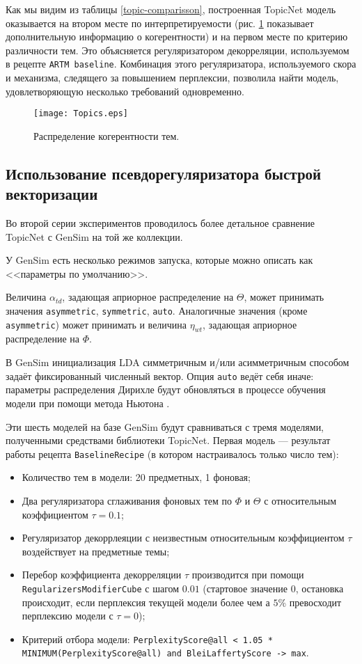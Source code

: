 Как мы видим из таблицы \ref{topic-comparisson}, построенная TopicNet модель  оказывается на втором месте по интерпретируемости (рис. \ref{topics_distribution} показывает дополнительную информацию о когерентности) и на первом месте по критерию различности тем. Это объясняется регуляризатором декорреляции, используемом в рецепте \texttt{ARTM baseline}. Комбинация этого регуляризатора, используемого скора и механизма, следящего за повышением перплексии, позволила найти модель, удовлетворяющую несколько требований одновременно.

\begin{figure}[!ht]
    \centering
    \texttt{[image: Topics.eps]}
    \caption{Распределение когерентности тем.}
\label{topics_distribution}
\end{figure}

\subsection{Использование псевдорегуляризатора быстрой векторизации}

Во второй серии экспериментов проводилось более детальное сравнение TopicNet с GenSim на той же коллекции.

У GenSim есть несколько режимов запуска, которые можно описать как <<параметры по умолчанию>>. 

Величина $\alpha_{td}$, задающая априорное распределение на $\Theta$, может принимать значения \texttt{asymmetric}, \texttt{symmetric}, \texttt{auto}. Аналогичные значения (кроме \texttt{asymmetric}) может принимать и величина $\eta_{wt}$, задающая априорное распределение на $\Phi$. 

В GenSim инициализация LDA симметричным и/или асимметричным способом задаёт фиксированный численный вектор. Опция \texttt{auto} ведёт себя иначе: параметры распределения Дирихле будут обновляться в процессе обучения модели при помощи метода Ньютона \cite{huang2005maximum}. 

Эти шесть моделей на базе GenSim будут сравниваться с тремя моделями, полученными средствами библиотеки TopicNet. Первая модель --- результат работы рецепта \texttt{BaselineRecipe} (в котором настраивалось только число тем):

\begin{itemize}
    \item Количество тем в модели: 20 предметных, 1 фоновая; 
    \item Два регуляризатора сглаживания фоновых тем по $\Phi$ и $\Theta$ с относительным коэффициентом $\tau=0.1$; 
    \item Регуляризатор декоррлеяции с неизвестным относительным коэффициентом $\tau$ воздействует на предметные темы;
    \item Перебор коэффициента декорреляции $\tau$ производится при помощи \texttt{RegularizersModifierCube} с шагом $0.01$ (стартовое значение $0$, остановка происходит, если перплексия текущей модели более чем а $5\%$ превосходит перплексию модели с $\tau=0$);
    \item Критерий отбора модели: \texttt{PerplexityScore@all < 1.05 * MINIMUM(PerplexityScore@all) and BleiLaffertyScore -> max}. 
\end{itemize}

